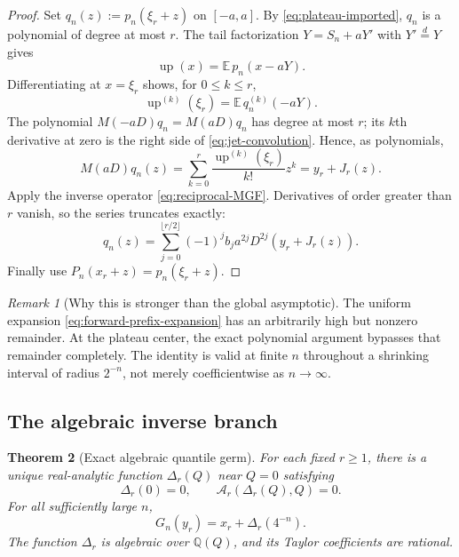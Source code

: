 \documentclass[11pt,oneside]{article}
\numberwithin{equation}{section}
\newtheorem{theorem}{Theorem}[section]
\theoremstyle{definition}
\theoremstyle{remark}
\newtheorem{remark}[theorem]{Remark}
\newcommand{\Q}{\mathbb Q}
\newcommand{\E}{\mathbb E}
\newcommand{\Up}{\operatorname{up}}
\newcommand{\Fn}{P_n}
\begin{document}
\begin{proof}
Set $q_n(z):=p_n(\xi_r+z)$ on $[-a,a]$.  By
\eqref{eq:plateau-imported}, $q_n$ is a polynomial of degree at most $r$.
The tail factorization $Y=S_n+aY'$ with $Y'\stackrel d=Y$ gives
\begin{equation}
 \Up(x)=\E\,p_n(x-aY).
 \label{eq:convolution-expectation}
\end{equation}
Differentiating at $x=\xi_r$ shows, for $0\le k\le r$,
\begin{equation}
 \Up^{(k)}(\xi_r)=\E\,q_n^{(k)}(-aY).
 \label{eq:jet-convolution}
\end{equation}
The polynomial $M(-aD)q_n=M(aD)q_n$ has degree at most $r$; its $k$th
derivative at zero is the right side of \eqref{eq:jet-convolution}.  Hence, as
polynomials,
\begin{equation}
 M(aD)q_n(z)=
 \sum_{k=0}^{r}\frac{\Up^{(k)}(\xi_r)}{k!}z^k
 =y_r+J_r(z).
 \label{eq:polynomial-smoothing}
\end{equation}
Apply the inverse operator \eqref{eq:reciprocal-MGF}.  Derivatives of order greater
than $r$ vanish, so the series truncates exactly:
\[
 q_n(z)=\sum_{j=0}^{\lfloor r/2\rfloor}
 (-1)^jb_ja^{2j}D^{2j}(y_r+J_r(z)).
\]
Finally use $\Fn(x_r+z)=p_n(\xi_r+z)$.
\end{proof}

\begin{remark}[Why this is stronger than the global asymptotic]
The uniform expansion \eqref{eq:forward-prefix-expansion} has an arbitrarily high but
nonzero remainder.  At the plateau center, the exact polynomial argument bypasses that
remainder completely.  The identity is valid at finite $n$ throughout a shrinking interval
of radius $2^{-n}$, not merely coefficientwise as $n\to\infty$.
\end{remark}

\subsection{The algebraic inverse branch}

\begin{theorem}[Exact algebraic quantile germ]
\label{thm:algebraic-germ}
For each fixed $r\ge1$, there is a unique real-analytic function $\Delta_r(Q)$ near
$Q=0$ satisfying
\begin{equation}
 \Delta_r(0)=0,
 \qquad
 \mathcal A_r(\Delta_r(Q),Q)=0.
 \label{eq:Delta-implicit}
\end{equation}
For all sufficiently large $n$,
\begin{equation}
 \boxed{
 G_n(y_r)=x_r+\Delta_r(4^{-n}).}
 \label{eq:exact-quantile-germ}
\end{equation}
The function $\Delta_r$ is algebraic over $\Q(Q)$, and its Taylor coefficients are
rational.
\end{theorem}
\end{document}
